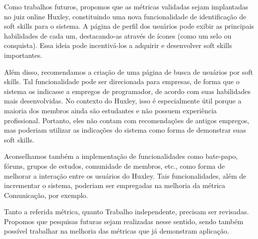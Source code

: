 Como trabalhos futuros, propomos que as métricas validadas sejam implantadas no juiz online Huxley, constituindo uma nova funcionalidade de identificação de soft skills para o sistema. A página de perfil dos usuários pode exibir as principais habilidades de cada um, destacando-as através de ícones (como um selo ou conquista). Essa ideia pode incentivá-los a adquirir e desenvolver soft skills importantes.

Além disso, recomendamos a criação de uma página de busca de usuários por soft skills. Tal funcionalidade pode ser direcionada para empresas, de forma que o sistema os indicasse a empregos de programador, de acordo com suas habilidades mais desenvolvidas. No contexto do Huxley, isso é especialmente útil porque a maioria dos membros ainda são estudantes e não possuem experiência profissional. Portanto, eles não contam com recomendações de antigos empregos, mas poderiam utilizar as indicações do sistema como forma de demonstrar suas soft skills.

Aconselhamos também a implementação de funcionalidades como bate-papo, fóruns, grupos de estudos, comunidade de membros, etc., como forma de melhorar a interação entre os usuários do Huxley. Tais funcionalidades, além de incrementar o sistema, poderiam ser empregadas na melhoria da métrica Comunicação, por exemplo.

Tanto a referida métrica, quanto Trabalho independente, precisam ser revisadas. Propomos que pesquisas futuras sejam realizadas nesse sentido, sendo também possível trabalhar na melhoria das métricas que já demonstram aplicação.




